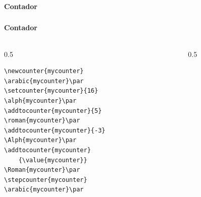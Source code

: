 \documentclass[12pt,aspectratio=169,ignorenonframetext]{ltxbeamer}
\begin{document}
\begin{frame}[fragile]
\frametitle{{\lmr\LaTeXe}}
\framesubtitle{Contador}

\begin{itemize}
    \item \texttt{\newcounter}
    \item \texttt{\stepcounter}
    \item \texttt{\setcounter}
    \item \texttt{\addtocounter}
\end{itemize}
\end{frame}





\begin{frame}[fragile]
\frametitle{{\lmr\LaTeXe}}
\framesubtitle{Contador}

\begin{columns}
    \begin{column}{0.5\textwidth}
        \begin{verbatim}
\newcounter{mycounter}
\arabic{mycounter}\par
\setcounter{mycounter}{16}
\alph{mycounter}\par
\addtocounter{mycounter}{5}
\roman{mycounter}\par
\addtocounter{mycounter}{-3}
\Alph{mycounter}\par
\addtocounter{mycounter}
    {\value{mycounter}}
\Roman{mycounter}\par
\stepcounter{mycounter}
\arabic{mycounter}\par
        \end{verbatim}
    \end{column}
    {\color{gray} \vline}
    \begin{column}{0.5\linewidth}
        \lmr
        \par
        \setcounter{mycounter}{16}
        \par
        \addtocounter{mycounter}{5}
        \par
        \addtocounter{mycounter}{-3}
        \par
        \addtocounter{mycounter}{\value{mycounter}}
        \par
        \par
    \end{column}
\end{columns}
\end{frame}
\end{document}
